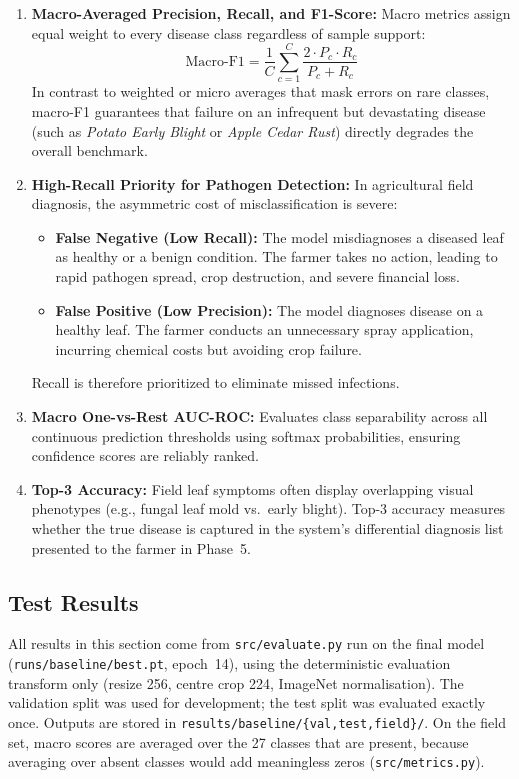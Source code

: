 \begin{enumerate}[leftmargin=*]
    \item \textbf{Macro-Averaged Precision, Recall, and F1-Score:} Macro metrics assign equal weight to every disease class regardless of sample support:
    \begin{equation}
        \text{Macro-F1} = \frac{1}{C}\sum_{c=1}^{C} \frac{2 \cdot P_c \cdot R_c}{P_c + R_c}
    \end{equation}
    In contrast to weighted or micro averages that mask errors on rare classes, macro-F1 guarantees that failure on an infrequent but devastating disease (such as \textit{Potato Early Blight} or \textit{Apple Cedar Rust}) directly degrades the overall benchmark.
    \item \textbf{High-Recall Priority for Pathogen Detection:} In agricultural field diagnosis, the asymmetric cost of misclassification is severe:
    \begin{itemize}
        \item \textbf{False Negative (Low Recall):} The model misdiagnoses a diseased leaf as healthy or a benign condition. The farmer takes no action, leading to rapid pathogen spread, crop destruction, and severe financial loss.
        \item \textbf{False Positive (Low Precision):} The model diagnoses disease on a healthy leaf. The farmer conducts an unnecessary spray application, incurring chemical costs but avoiding crop failure.
    \end{itemize}
    Recall is therefore prioritized to eliminate missed infections.
    \item \textbf{Macro One-vs-Rest AUC-ROC:} Evaluates class separability across all continuous prediction thresholds using softmax probabilities, ensuring confidence scores are reliably ranked.
    \item \textbf{Top-3 Accuracy:} Field leaf symptoms often display overlapping visual phenotypes (e.g., fungal leaf mold vs.\ early blight). Top-3 accuracy measures whether the true disease is captured in the system's differential diagnosis list presented to the farmer in Phase~5.
\end{enumerate}

\subsection{Test Results}
\label{subsec:test_results}

All results in this section come from \texttt{src/evaluate.py} run on the final model (\texttt{runs/baseline/best.pt}, epoch~14), using the deterministic evaluation transform only (resize 256, centre crop 224, ImageNet normalisation). The validation split was used for development; the test split was evaluated exactly once. Outputs are stored in \texttt{results/baseline/\{val,test,field\}/}. On the field set, macro scores are averaged over the 27 classes that are present, because averaging over absent classes would add meaningless zeros (\texttt{src/metrics.py}).

